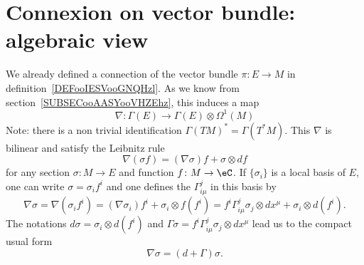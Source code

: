 \section{Connexion on vector bundle: algebraic view}

We already defined a connection of the vector bundle \( \pi\colon E\to M\) in definition~\ref{DEFooIESVooGNQHzl}. As we know from section~\ref{SUBSECooAASYooVHZEhz}, this induces a map
\begin{equation}        \label{EQooBRLHooJgzIyT}
    \nabla\colon \Gamma(E)\to \Gamma(E)\otimes \Omega^1(M)
\end{equation}
Note: there is a non trivial identification \( \Gamma(TM)^*=\Gamma(T^*M)\). This \( \nabla\) is bilinear and satisfy the Leibnitz rule
\begin{equation}
\nabla(\sigma f)=(\nabla\sigma)f+\sigma\otimes df
\end{equation}
for any section $\sigma\colon M\to E$ and function $f\colon M\to \eC$. If $\{ \sigma_i \}$ is a local basis of $E$, one can write $\sigma=\sigma_if^i$ and one defines the  $\Gamma_{i\mu}^{j}$ in this basis by
\begin{equation}
\nabla \sigma=\nabla (\sigma_if^i)
		=(\nabla \sigma_i)f^i+\sigma_i\otimes f(f^i)
		=f^i\Gamma_{i\mu}^{j}\sigma_j\otimes dx^{\mu}+\sigma_i\otimes d(f^i).
\end{equation}
The notations $d\sigma=\sigma_i\otimes d(f^i)$ and $\Gamma\sigma=f^i\Gamma_{i\mu}^{j}\sigma_j\otimes dx^{\mu}$ lead us to the compact usual form
\[
  \nabla\sigma=(d+\Gamma)\sigma.
\]

